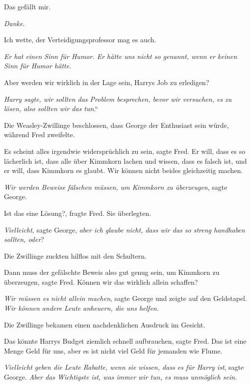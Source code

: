 \glqq{}Das gefällt mir.\grqq{}

\glqq{}\emph{Danke}.\grqq{}

\glqq{}Ich wette, der Verteidigungsprofessor mag es auch.\grqq{}

\glqq{}\emph{Er hat einen Sinn für Humor. Er hätte uns nicht so genannt, wenn er
keinen Sinn für Humor hätte.}\grqq{}

\glqq{}Aber werden wir wirklich in der Lage sein, Harrys Job zu
erledigen?\grqq{}

\glqq{}\emph{Harry sagte, wir sollten das Problem besprechen, bevor wir
versuchen, es zu lösen, also sollten wir das tun}.“

Die Weasley-Zwillinge beschlossen, dass George der Enthusiast sein würde,
während Fred zweifelte.

\glqq{}Es scheint alles irgendwie widersprüchlich zu sein\grqq{}, sagte Fred.
\glqq{}Er will, dass es so lächerlich ist, dass alle über Kimmkorn lachen und
wissen, dass es falsch ist, und er will, dass Kimmkorn es glaubt. Wir können
nicht beides gleichzeitig machen.\grqq{}

\glqq{}\emph{Wir werden Beweise fälschen müssen, um Kimmkorn zu
überzeugen}\grqq{}, sagte George.

\glqq{}Ist das eine Lösung?\grqq{}, fragte Fred. Sie überlegten.

\glqq{}\emph{Vielleicht}\grqq{}, sagte George, \glqq{}\emph{aber ich glaube
nicht, dass wir das so streng handhaben sollten, oder}?\grqq{}

Die Zwillinge zuckten hilflos mit den Schultern.

\glqq{}Dann muss der gefälschte Beweis also gut genug sein, um Kimmkorn zu
überzeugen\grqq{}, sagte Fred. \glqq{}Können wir das wirklich allein
schaffen?\grqq{}

\glqq{}\emph{Wir müssen es nicht allein machen}\grqq{}, sagte George und zeigte
auf den Geldstapel. \glqq{}\emph{Wir können andere Leute anheuern, die uns
helfen.}\grqq{}

Die Zwillinge bekamen einen nachdenklichen Ausdruck im Gesicht.

\glqq{}Das könnte Harrys Budget ziemlich schnell aufbrauchen\grqq{}, sagte Fred.
\glqq{}Das ist eine Menge Geld für uns, aber es ist nicht viel Geld für jemanden
wie Flume.\grqq{}

\glqq{}\emph{Vielleicht geben die Leute Rabatte, wenn sie wissen, dass es für
Harry ist}\grqq{}, sagte George. \glqq{}\emph{Aber das Wichtigste ist, was immer
wir tun, es muss unmöglich sein.}\grqq{}

